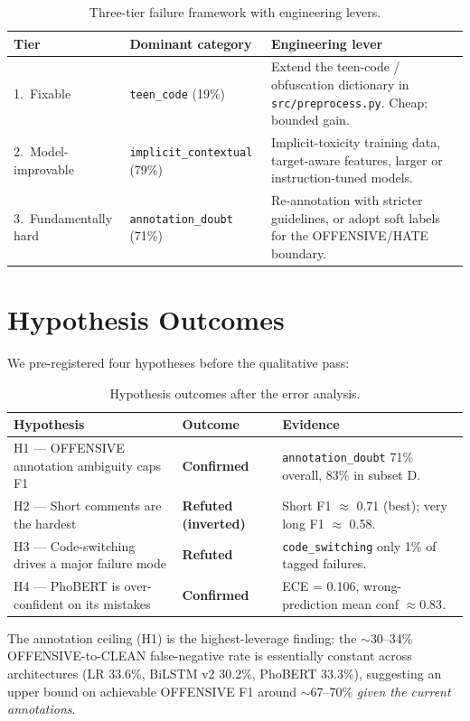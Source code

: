\documentclass[a4paper,12pt,oneside]{report}
\begin{document}
\begin{table}[H]
\centering
\caption{Three-tier failure framework with engineering levers.}
\label{tab:tiers}
\begin{tabular}{p{2.6cm} p{3.2cm} p{5.5cm}}
\toprule
Tier & Dominant category & Engineering lever \\ \midrule
1.\ Fixable          & \texttt{teen\_code} (19\%)            & Extend the teen-code / obfuscation dictionary in \texttt{src/preprocess.py}. Cheap; bounded gain. \\
2.\ Model-improvable & \texttt{implicit\_contextual} (79\%)   & Implicit-toxicity training data, target-aware features, larger or instruction-tuned models. \\
3.\ Fundamentally hard & \texttt{annotation\_doubt} (71\%) & Re-annotation with stricter guidelines, or adopt soft labels for the OFFENSIVE/HATE boundary. \\ \bottomrule
\end{tabular}
\end{table}

\section{Hypothesis Outcomes}
\label{sec:hypotheses}
We pre-registered four hypotheses before the qualitative pass:

\begin{table}[H]
\centering
\caption{Hypothesis outcomes after the error analysis.}
\label{tab:hypotheses}
\begin{tabular}{p{6.5cm} p{2.2cm} p{4cm}}
\toprule
Hypothesis & Outcome & Evidence \\ \midrule
H1 --- OFFENSIVE annotation ambiguity caps F1 & \textbf{Confirmed} &
\texttt{annotation\_doubt} 71\% overall, 83\% in subset D. \\
H2 --- Short comments are the hardest & \textbf{Refuted (inverted)} &
Short F1 $\approx$ 0.71 (best); very long F1 $\approx$ 0.58. \\
H3 --- Code-switching drives a major failure mode & \textbf{Refuted} &
\texttt{code\_switching} only 1\% of tagged failures. \\
H4 --- PhoBERT is over-confident on its mistakes & \textbf{Confirmed} &
ECE = 0.106, wrong-prediction mean conf $\approx 0.83$. \\ \bottomrule
\end{tabular}
\end{table}

The annotation ceiling (H1) is the highest-leverage finding: the
$\sim$30--34\% OFFENSIVE-to-CLEAN false-negative rate is essentially
constant across architectures (LR 33.6\%, BiLSTM v2 30.2\%, PhoBERT
33.3\%), suggesting an upper bound on achievable OFFENSIVE F1 around
$\sim$67--70\% \emph{given the current annotations}.
\end{document}

